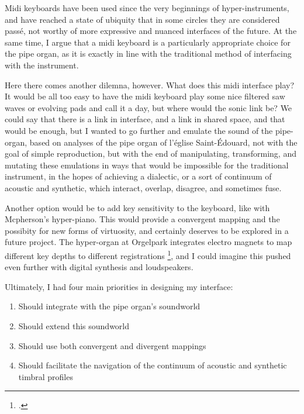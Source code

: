 \documentclass[12pt,twoside,maitrise]{dms_ks}
\theoremstyle{definition}
\begin{document}
{Midi keyboards have been used since the very beginnings of hyper-instruments, and have reached a state of ubiquity that in some circles they are considered passé, not worthy of more expressive and nuanced interfaces of the future.
At the same time, I argue that a midi keyboard is a particularly appropriate choice for the pipe organ, as it is exactly in line with the traditional method of interfacing with the instrument.

Here there comes another dilemna, however.
What does this midi interface play?
It would be all too easy to have the midi keyboard play some nice filtered saw waves or evolving pads and call it a day, but where would the sonic link be?
We could say that there is a link in interface, and a link in shared space, and that would be enough, but I wanted to go further and emulate the sound of the pipe-organ, based on analyses of the pipe organ of l'église Saint-Édouard, not with the goal of simple reproduction, but with the end of manipulating, transforming, and mutating these emulations in ways that would be impossible for the traditional instrument, in the hopes of achieving a dialectic, or a sort of continuum of acoustic and synthetic, which interact, overlap, disagree, and sometimes fuse.

Another option would be to add key sensitivity to the keyboard, like with Mcpherson's hyper-piano. This would provide a convergent mapping and the possibity for new forms of virtuosity, and certainly deserves to be explored in a future project. The hyper-organ at Orgelpark integrates electro magnets to map different key depths to different registrations \footcite[14]{van_heumen_new_2014}, and I could imagine this pushed even further with digital synthesis and loudspeakers. 

Ultimately, I had four main priorities in designing my interface:

\begin{enumerate}
  \item Should integrate with the pipe organ's soundworld

  \item Should extend this soundworld
   
  \item Should use both convergent and divergent mappings

  \item Should facilitate the navigation of the continuum of acoustic
and synthetic timbral profiles
\end{enumerate}

}
\end{document}

